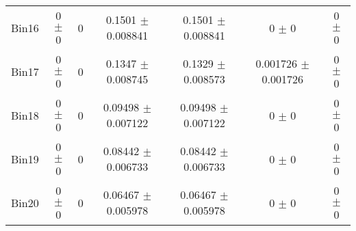 \begin{tabular}{@{\extracolsep{4pt}}lcccccc@{}}
     Bin16 & 0 $\pm$ 0 & 0 & 0.1501 $\pm$ 0.008841 & 0.1501 $\pm$ 0.008841 & 0 $\pm$ 0 & 0 $\pm$ 0 \\ 
     Bin17 & 0 $\pm$ 0 & 0 & 0.1347 $\pm$ 0.008745 & 0.1329 $\pm$ 0.008573 & 0.001726 $\pm$ 0.001726 & 0 $\pm$ 0 \\ 
     Bin18 & 0 $\pm$ 0 & 0 & 0.09498 $\pm$ 0.007122 & 0.09498 $\pm$ 0.007122 & 0 $\pm$ 0 & 0 $\pm$ 0 \\ 
     Bin19 & 0 $\pm$ 0 & 0 & 0.08442 $\pm$ 0.006733 & 0.08442 $\pm$ 0.006733 & 0 $\pm$ 0 & 0 $\pm$ 0 \\ 
     Bin20 & 0 $\pm$ 0 & 0 & 0.06467 $\pm$ 0.005978 & 0.06467 $\pm$ 0.005978 & 0 $\pm$ 0 & 0 $\pm$ 0 \\ 
\hline\hline
  \end{tabular}
